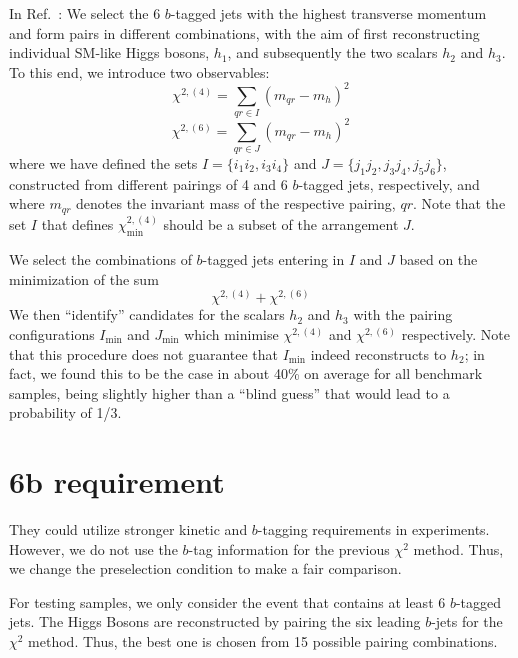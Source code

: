 \documentclass[12pt]{article}
\begin{document}
	In Ref.~\cite{Papaefstathiou:2020lyp}: We select the 6 $b$-tagged jets with the highest transverse momentum and form pairs in different combinations, with the aim of first reconstructing individual SM-like Higgs bosons, $h_1$, and subsequently the two scalars $h_2$ and $h_3$. To this end, we introduce two observables:
	\begin{equation}
		\chi^{2,(4)} = \sum_{qr\in I} (m_{qr} - m_h)^2
	\end{equation}
	\begin{equation}
		\chi^{2,(6)} = \sum_{qr\in J} (m_{qr} - m_h)^2
	\end{equation}
	where we have defined the sets $I = \{i_1i_2,i_3i_4\}$ and $J = \{j_1j_2,j_3j_4,j_5j_6\}$, constructed from different pairings of 4 and 6 $b$-tagged jets, respectively, and where $m_{qr}$ denotes the invariant mass of the respective pairing, $qr$. Note that the set $I$ that defines $\chi_{\text{min}}^{2,(4)}$ should be a subset of the arrangement $J$.

	We select the combinations of $b$-tagged jets entering in $I$ and $J$ based on the minimization of the sum
	\begin{equation}
		\chi^{2,(4)} + \chi^{2,(6)}
	\end{equation}
	We then ``identify'' candidates for the scalars $h_2$ and $h_3$ with the pairing configurations $I_{\text{min}}$ and $J_{\text{min}}$ which minimise $\chi^{2,(4)}$ and $\chi^{2,(6)}$ respectively. Note that this procedure does not guarantee that $I_{\text{min}}$ indeed reconstructs to $h_2$; in fact, we found this to be the case in about 40\% on average for all benchmark samples, being slightly higher than a ``blind guess'' that would lead to a probability of 1/3.

\section{6b requirement}%
\label{sec:6b_requirement}
	They could utilize stronger kinetic and $b$-tagging requirements in experiments. However, we do not use the $b$-tag information for the previous $\chi^2$ method. Thus, we change the preselection condition to make a fair comparison.

	For testing samples, we only consider the event that contains at least 6 $b$-tagged jets. The Higgs Bosons are reconstructed by pairing the six leading $b$-jets for the $\chi^2$ method. Thus, the best one is chosen from 15 possible pairing combinations.
\end{document}
